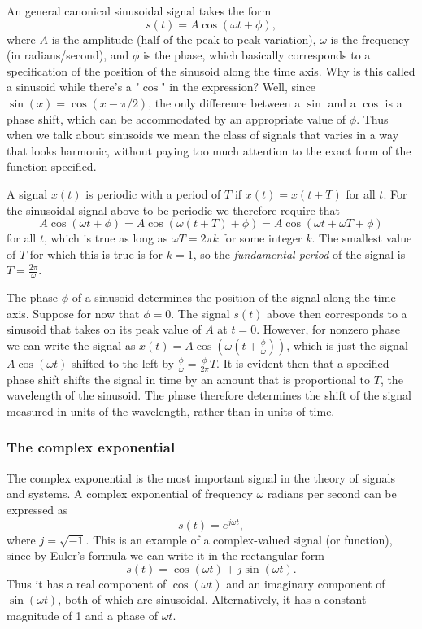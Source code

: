 \documentclass[10pt]{beamer}
\begin{document}
An general canonical sinusoidal signal takes the form
\begin{equation*}
  s(t) = A \cos(\omega t + \phi),
\end{equation*}
where $A$ is the amplitude (half of the peak-to-peak variation), $\omega$ is the frequency (in radians/second), and $\phi$ is the phase, which basically corresponds to a specification of the position of the sinusoid along the time axis.  Why is this called a sinusoid while there's a "$\cos$" in the expression?  Well, since $\sin(x) = \cos(x-\pi/2)$, the only difference between a $\sin$ and a $\cos$ is a phase shift, which can be accommodated by an appropriate value of $\phi$.  Thus when we talk about sinusoids we mean the class of signals that varies in a way that looks harmonic, without paying too much attention to the exact form of the function specified.  

A signal $x(t)$ is periodic with a period of $T$ if $x(t) = x(t+T)$ for all $t$.  For the sinusoidal signal above to be periodic we therefore require that
\begin{equation*}
  A \cos(\omega t + \phi) = A \cos(\omega (t+T) + \phi) = A \cos(\omega t + \omega T + \phi)
\end{equation*}
for all $t$, which is true as long as $\omega T = 2 \pi k$ for some integer $k$.  The smallest value of $T$ for which this is true is for $k=1$, so the {\em fundamental period} of the signal is $T = \frac{2 \pi}{\omega}$.  

The phase $\phi$ of a sinusoid determines the position of the signal along the time axis.  Suppose for now that $\phi = 0$.  The signal $s(t)$ above then corresponds to a sinusoid that takes on its peak value of $A$ at $t=0$.  However, for nonzero phase we can write the signal as $x(t) = A \cos(\omega (t + \frac{\phi}{\omega}))$, which is just the signal $A \cos(\omega t)$ shifted to the left by $\frac{\phi}{\omega} = \frac{\phi}{2 \pi} T$.  It is evident then that a specified phase shift shifts the signal in time by an amount that is proportional to $T$, the wavelength of the sinusoid.  The phase therefore determines the shift of the signal measured in units of the wavelength, rather than in units of time.
\subsubsection{The complex exponential}

The complex exponential is the most important signal in the theory of signals and systems.  A complex exponential of frequency $\omega$ radians per second can be expressed as
\begin{equation*}
  s(t) = e^{j \omega t},
\end{equation*}
where $j = \sqrt{-1}$.  This is an example of a complex-valued signal (or function), since by Euler's formula we can write it in the rectangular form
\begin{equation*}
  s(t) = \cos(\omega t) + j \sin(\omega t).
\end{equation*}
Thus it has a real component of $\cos(\omega t)$ and an imaginary component of $\sin(\omega t)$, both of which are sinusoidal.  Alternatively, it has a constant magnitude of 1 and a phase of $\omega t$.
\end{document}

